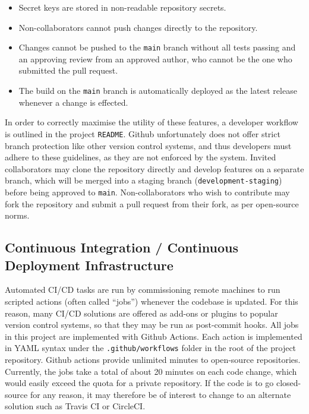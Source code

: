 \begin{itemize}
    \item Secret keys are stored in non-readable repository secrets.
    \item Non-collaborators cannot push changes directly to the repository.
    \item Changes cannot be pushed to the \texttt{main} branch without all tests passing and an approving review from an approved author, who cannot be the one who submitted the pull request.
    \item The build on the \texttt{main} branch is automatically deployed as the latest release whenever a change is effected.
\end{itemize}

In order to correctly maximise the utility of these features, a developer workflow is outlined in the project \texttt{README}. Github unfortunately does not offer strict branch protection like other version control systems, and thus developers must adhere to these guidelines, as they are not enforced by the system. Invited collaborators may clone the repository directly and develop features on a separate branch, which will be merged into a staging branch (\texttt{development-staging}) before being approved to \texttt{main}. Non-collaborators who wish to contribute may fork the repository and submit a pull request from their fork, as per open-source norms.

\subsection{Continuous Integration / Continuous Deployment Infrastructure}
Automated CI/CD tasks are run by commissioning remote machines to run scripted actions (often called ``jobs'') whenever the codebase is updated. For this reason, many CI/CD solutions are offered as add-ons or plugins to popular version control systems, so that they may be run as post-commit hooks. All jobs in this project are implemented with Github Actions. Each action is implemented in YAML syntax under the \texttt{.github/workflows} folder in the root of the project repository. Github actions provide unlimited minutes to open-source repositories. Currently, the jobs take a total of about 20 minutes on each code change, which would easily exceed the quota for a private repository. If the code is to go closed-source for any reason, it may therefore be of interest to change to an alternate solution such as Travis CI or CircleCI.

